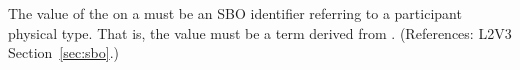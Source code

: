 The value of the   on a \CompartmentType must be an SBO
identifier referring to a participant physical type.  That is, the value
must be a term derived from \sboparticipantphysical.  (References: 
L2V3 Section~\ref{sec:sbo}.)

